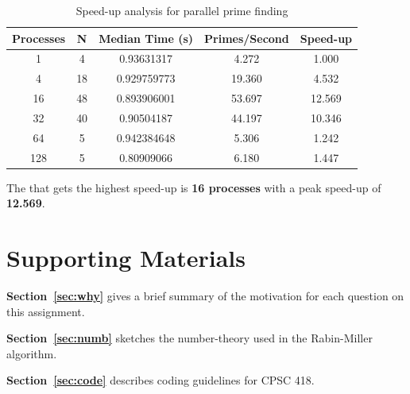\documentclass{article}
\begin{document}
\begin{enumerate}
\begin{enumerate}
        \begin{table}[H]
        \centering
        \caption*{Speed-up analysis for parallel prime finding}
        \begin{tabular}{|c|c|c|c|c|}
        \hline
        \textbf{Processes} & \textbf{N} & \textbf{Median Time (s)} & \textbf{Primes/Second} & \textbf{Speed-up} \\
        \hline
        1 & 4 & 0.93631317 & 4.272 & 1.000 \\
        \hline
        4 & 18 & 0.929759773 & 19.360 & 4.532 \\
        \hline
        16 & 48 & 0.893906001 & 53.697 & 12.569 \\
        \hline
        32 & 40 & 0.90504187 & 44.197 & 10.346 \\
        \hline
        64 & 5 & 0.942384648 & 5.306 & 1.242 \\
        \hline
        128 & 5 & 0.80909066 & 6.180 & 1.447 \\
        \hline
        \end{tabular}
        \end{table}

        The  that gets the highest speed-up is \textbf{16 processes} with a peak speed-up of \textbf{12.569}.
    \end{enumerate}

\end{enumerate}


\section{Supporting Materials}
  \begin{description}
    \item{\textbf{Section~\ref{sec:why}}} gives a brief summary of the motivation for each question on this assignment.
    \item{\textbf{Section~\ref{sec:numb}}} sketches the number-theory used in the Rabin-Miller algorithm.
    \item{\textbf{Section~\ref{sec:code}}} describes coding guidelines for CPSC 418.
  \end{description}
\end{document}
